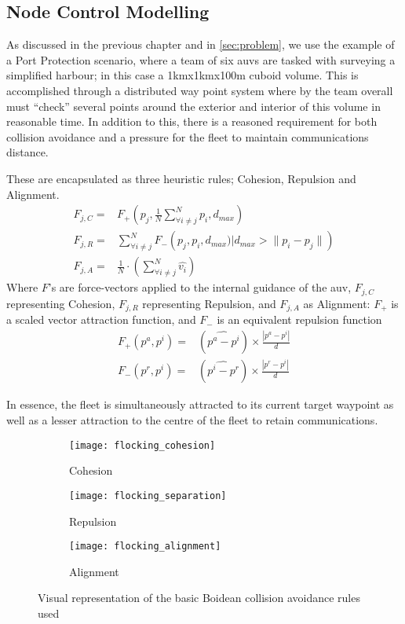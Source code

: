 \subsection{Node Control Modelling}

As discussed in the previous chapter and in \autoref{sec:problem}, we use the example of a Port Protection scenario, where a team of six \glspl{auv} are tasked with surveying a simplified harbour; in this case a 1kmx1kmx100m cuboid volume.
This is accomplished through a distributed way point system where by the team overall must ``check'' several points around the exterior and interior of this volume in reasonable time.
In addition to this, there is a reasoned requirement for both collision avoidance and a pressure for the fleet to maintain communications distance.

These are encapsulated as three heuristic rules; Cohesion, Repulsion and Alignment.
\begin{align}
  F_{j,C}=& F_+\left(p_j, \frac{1}{N}\sum\limits_{\forall i \ne j}^N{p_i}, d_{max}\right)\label{eq:fa}\\
  F_{j,R}=& \sum\limits_{\forall i \ne j}^N F_-\left(p_j, p_i, d_{max}) \big| d_{max}>\|p_i-p_j\|\right)\label{eq:fr}\\
  F_{j,A}=& \frac{1}{N}\cdot\left(\sum\limits_{\forall i \ne j}^N \hat{v_i}\right)\label{eq:fc}
\end{align}
Where $F$'s are force-vectors applied to the internal guidance of the \gls{auv}, $F_{j,C}$ representing Cohesion, $F_{j,R}$ representing Repulsion, and $F_{j,A}$ as Alignment: $F_+$ is a scaled vector attraction function, and $F_-$ is an equivalent repulsion function
\begin{align}
  F_+(p^a, p^i)=&(\widehat{p^a-p^i}) \times \frac{|p^a-p^i|}{d}\\
  F_-(p^r, p^i)=&(\widehat{p^i-p^r}) \times \frac{|p^r-p^i|}{d}
\end{align}

In essence, the fleet is simultaneously attracted to its current target waypoint as well as a lesser attraction to the centre of the fleet to retain communications.

\begin{figure*}
  \centering
  \begin{subfigure}[t]{0.3\textwidth}
    \centering
    \texttt{[image: flocking\_cohesion]}
    \caption{Cohesion}
  \end{subfigure}
  \begin{subfigure}[t]{0.3\textwidth}
    \centering
    \texttt{[image: flocking\_separation]}
    \caption{Repulsion}
  \end{subfigure}
  \begin{subfigure}[t]{0.3\textwidth}
    \centering
    \texttt{[image: flocking\_alignment]}
    \caption{Alignment}
  \end{subfigure}
  \caption{Visual representation of the basic Boidean collision avoidance rules used}
  \label{fig:boids}
\end{figure*}


